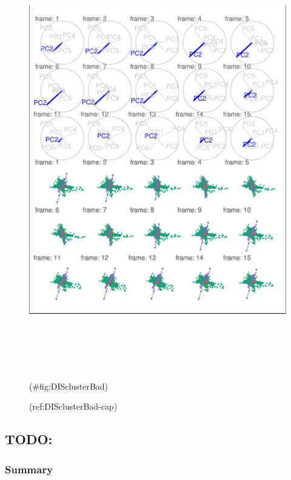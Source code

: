 \begin{Schunk}
\begin{figure}

{\centering \includegraphics[width=6in,height=7.2in]{spinifex_paper_files/figure-latex/DISclusterBad-1} 

}

\caption[(ref:DISclusterBad-cap)]{(ref:DISclusterBad-cap)}(\#fig:DISclusterBad)
\end{figure}
\end{Schunk}

\hypertarget{todo}{%
\subsection{TODO:}\label{todo}}

\hypertarget{summary}{%
\subsubsection{Summary}\label{summary}}

